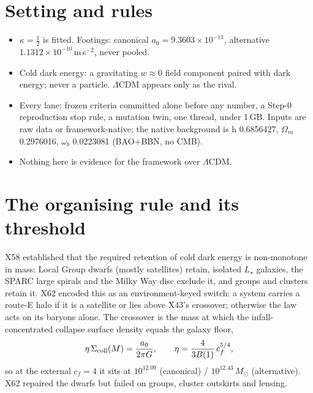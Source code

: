 \documentclass[10pt]{article}
\begin{document}
\begin{abstract}
\begin{enumerate}
\item \textbf{What remains of the cores is one line.} At the measured slope the groups need $c_f\gtrsim4.25$--$4.75$ while the clusters take $c_f\approx4$; the record's native zooms give $c_f$ falling with mass, the direction required.
\item \textbf{Below the threshold}, the surviving exclusion mechanism (M6, initial displacement) is not yet tested by the Lyman-$\alpha$ forest: four native forest models of increasing fidelity are each not diagnostic. If the forest-side budget is real, galaxies needing M6 must keep at least 19--56\,\% (canonical) or 28--83\,\% (alternative) of their initial patch baryons, against the record's own Lagrangian retention of 19.1\,\% / 16.3\,\%.
\end{enumerate}
\textbf{The questions posed:} what physics switches cold dark energy on at $M\gtrsim10^{12.4}\,M_\odot$, independently of the concentration of the halos it then forms; and what makes groups more concentrated than clusters?
\end{abstract}

\section{Setting and rules}
\begin{itemize}
\item $\kappa=\tfrac12$ is fitted. Footings: canonical $a_0=9.3603\times10^{-11}$, alternative $1.1312\times10^{-10}$\,m\,s$^{-2}$, never pooled.
\item Cold dark energy: a gravitating $w\approx0$ field component paired with dark energy; never a particle. $\Lambda$CDM appears only as the rival.
\item Every lane: frozen criteria committed alone before any number, a Step-0 reproduction stop rule, a mutation twin, one thread, under 1\,GB. Inputs are raw data or framework-native; the native background is h 0.6856427, $\Omega_m$ 0.2976016, $\omega_b$ 0.0223081 (BAO+BBN, no CMB).
\item Nothing here is evidence for the framework over $\Lambda$CDM.
\end{itemize}

\section{The organising rule and its threshold}
X58 established that the required retention of cold dark energy is non-monotone in mass: Local Group dwarfs (mostly satellites) retain, isolated $L_\star$ galaxies, the SPARC large spirals and the Milky Way disc exclude it, and groups and clusters retain it. X62 encoded this as an environment-keyed switch: a system carries a route-E halo if it is a satellite or lies above X43's crossover; otherwise the law acts on its baryons alone. The crossover is the mass at which the infall-concentrated collapse surface density equals the galaxy floor,
\[
\eta\,\Sigma_{\rm coll}(M)=\frac{a_0}{2\pi G},\qquad \eta=\frac{4}{3B(1)}\,c_f^{5/4},
\]
so at the external $c_f=4$ it sits at $10^{12.09}$ (canonical) / $10^{12.43}\,M_\odot$ (alternative). X62 repaired the dwarfs but failed on groups, cluster outskirts and lensing.
\end{document}

